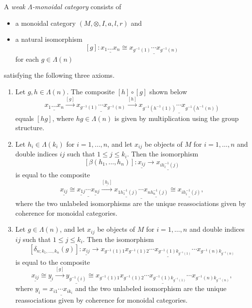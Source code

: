 \begin{Defi}\label{Defi:wk-lmc}
A \emph{weak $\Lambda$-monoidal category} consists of
\begin{itemize}
\item a monoidal category $(M, \otimes, I, a, l, r)$ and
\item a natural isomorphism
\[
[g] \colon \underline{x_1 \dots x_n} \cong \underline{x_{g^{-1}(1)} \cdots x_{g^{-1}(n)} }
\]
for each $g \in \Lambda(n)$
\end{itemize}
satisfying the following three axioms.
\begin{enumerate}
\item Let $g, h \in \Lambda(n)$. The composite $[h] \circ [g]$ shown below
\[
\underline{x_1 \dots x_n} \stackrel{[g]}{\to} \underline{x_{g^{-1}(1)} \cdots x_{g^{-1}(n)} } \stackrel{[h]}{\to} \underline{x_{g^{-1}(h^{-1}(1))} \cdots x_{g^{-1}(h^{-1}(n))} } 
\]
equals $[hg]$, where $hg \in \Lambda(n)$ is given by multiplication using the group structure.
\item Let $h_i \in \Lambda(k_i)$ for $i=1, \ldots, n$, and let $x_{ij}$ be objects of $M$ for $i = 1, \ldots, n$ and double indices $ij$ such that $1 \leq j \leq k_i$. Then the isomorphism
\[
[\beta(h_1, \ldots, h_n)] \colon \underline{x_{ij}} \to \underline{x_{ih_i^{-1}(j)}}
\]
is equal to the composite
\[
\underline{x_{ij}} \cong \underline{\underline{x_{1j}} \cdots \underline{x_{nj}}} 
\stackrel{\underline{[h_i]}}{\to} 
\underline{\underline{x_{1h_1^{-1}(j)}} \cdots \underline{x_{nh_n^{-1}(j)}}} \cong
\underline{x_{ih_i^{-1}(j)}},
\]
where the two unlabeled isomorphisms are the unique reassociations given by coherence for monoidal categories.
\item Let $g \in \Lambda(n)$, and let $x_{ij}$ be objects of $M$ for $i = 1, \ldots, n$ and double indices $ij$ such that $1 \leq j \leq k_i$. Then the isomorphism
\[
[\delta_{n; k_1, \ldots, k_n}(g)] \colon \underline{x_{ij}} \to \underline{x_{g^{-1}(1)1} x_{g^{-1}(1)2}\cdots x_{g^{-1}(1)k_{g^{-1}(1)}} \cdots x_{g^{-1}(n)k_{g^{-1}(n)}}}
\]
is equal to the composite
\[
\underline{x_{ij}} \cong \underline{y_i} \stackrel{[g]}{\to} \underline{y_{g^{-1}(i)}} \cong \underline{x_{g^{-1}(1)1} x_{g^{-1}(1)2}\cdots x_{g^{-1}(1)k_{g^{-1}(1)}} \cdots x_{g^{-1}(n)k_{g^{-1}(n)}}},
\]
where $y_i = \underline{x_{i1} \cdots x_{ik_i}}$ and the two unlabeled isomorphism are the unique reassociations given by coherence for monoidal categories.
\end{enumerate}
\end{Defi}

